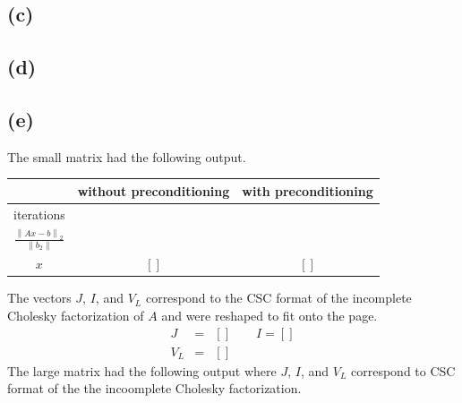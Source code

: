 \documentclass[11pt]{article}
\newcommand{\norm}[1]{\left\lVert#1\right\rVert}
\theoremstyle{definition}
\theoremstyle{remark}
\newcommand{\newpart}{\vspace{-0.5\baselineskip}\hrulefill\vspace{-1.3\baselineskip}}
\theoremstyle{plain}
\begin{document}
\newpage
\newpart
\subsection*{(c)}


\newpart
\subsection*{(d)}


\newpage
\newpart
\subsection*{(e)}


\newpage
The small matrix had the following output.

\begin{tabular}{c|c|c}
  &without preconditioning & with preconditioning\\\hline
  iterations&&\\\hline
  $\frac{\norm{Ax-b}_2}{\norm{b_2}}$&\texttt{}&\texttt{}\\\hline
  $x$ & $\left[\right]$ & $\left[\right]$
\end{tabular}
\newpage
The vectors $J$, $I$, and $V_L$ correspond to the CSC format of the incomplete Cholesky factorization of $A$ and were reshaped to fit onto the page.
\begin{eqnarray*}
  J&=&\left[\right]\qquad I=\left[\right]\\
  V_L&=&\left[\right]
\end{eqnarray*}
\newpage
The large matrix had the following output where $J$, $I$, and $V_L$ correspond to CSC format of the the incoomplete Cholesky factorization.
\end{document}
